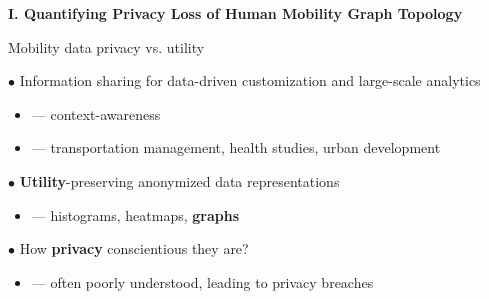 \documentclass[hyperref={colorlinks = true},unknownkeysallowed]{beamer}
\begin{document}
\begin{frame}
	\LARGE{\textbf{I. Quantifying Privacy Loss of Human Mobility Graph Topology}}
\end{frame}

\begin{frame}{ Mobility data privacy vs. utility}
	\vspace*{2.25mm}
\begin{block}{ $\bullet$ Information sharing for data-driven customization and large-scale analytics}
	\begin{itemize}
		  \setlength\itemsep{.3em}
		\item --- context-awareness
		\item --- transportation management, health studies, urban development
	\end{itemize}
\end{block}
\pause
\begin{block}{ $\bullet$ \textbf{Utility}-preserving anonymized data representations}
	\begin{itemize}
		  \setlength\itemsep{.3em}
	\item --- histograms, heatmaps, \textbf{graphs}
	\end{itemize}
\end{block}
\pause
\begin{block}{ $\bullet$ How \textbf{privacy} conscientious they are?}
	\begin{itemize}
		\item --- often poorly understood, leading to privacy breaches
	\end{itemize}
\end{block}
\end{frame}
\end{document}
